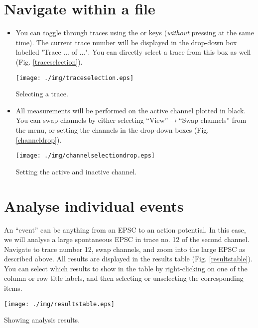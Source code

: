 \section{Navigate within a file}
\begin{itemize}
  \item You can toggle through traces using the \keybox{$\leftarrow$} or \keybox{$\rightarrow$} keys (\textit{without} pressing  at the same time). The current trace number will be displayed in the drop-down box labelled "Trace ... of ...". You can directly select a trace from this box as well (Fig. \ref{traceselection}).
  \begin{myfigure}[ht]
    \begin{center}
      \texttt{[image: ./img/traceselection.eps]}
    \end{center}
    \caption{Selecting a trace.}
    \label{traceselection}
  \end{myfigure}
  \item All measurements will be performed on the active channel plotted in black. You can swap channels by either selecting ``View''$\rightarrow$``Swap channels'' from the menu, or setting the channels in the drop-down boxes (Fig. \ref{channeldrop}).
  \begin{myfigure}[ht]
    \begin{center}
      \texttt{[image: ./img/channelselectiondrop.eps]}
    \end{center}
    \caption{Setting the active and inactive channel.}
    \label{channeldrop}
  \end{myfigure}
\end{itemize}

\section{Analyse individual events}
An ``event'' can be anything from an EPSC to an action potential. In this case, we will analyse a large spontaneous EPSC in trace no. 12 of the second channel. Navigate to trace number 12, swap channels, and zoom into the large EPSC as described above. All results are displayed in the results table (Fig. \ref{resultstable}). You can select which results to show in the table by right-clicking on one of the column or row title labels, and then selecting or unselecting the corresponding items.
  \begin{myfigure}[ht]
    \begin{center}
      \texttt{[image: ./img/resultstable.eps]}
    \end{center}
    \caption{Showing analysis results.}
    \label{resultstable}
  \end{myfigure}

